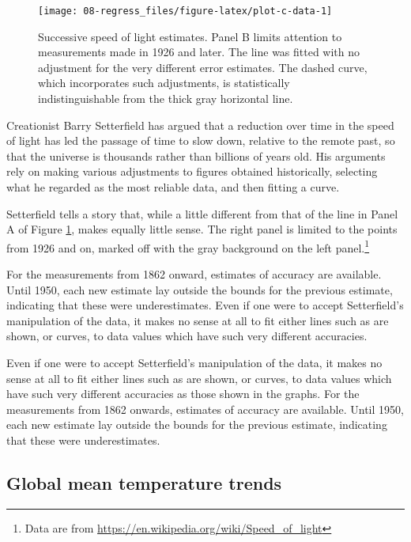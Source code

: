 \documentclass[
  10ptls,
  b5paper]{book}
\begin{document}
\begin{figure}[H]

{\centering \texttt{[image: 08-regress\_files/figure-latex/plot-c-data-1]} 

}

\caption{Successive speed of light estimates.  Panel B 
limits attention to measurements made in 1926 and later. 
The line was fitted with no adjustment for the very
different error estimates.  The dashed curve, which 
incorporates such adjustments, is statistically 
indistinguishable from the thick gray horizontal line.}\label{fig:plot-c-data}
\end{figure}

Creationist Barry Setterfield has argued that a reduction over time in the speed of light has led the passage of time to slow down, relative to the remote past, so that the universe is thousands rather than billions of years old. His arguments rely on making various adjustments to figures obtained historically, selecting what he regarded as the most reliable data, and then fitting a curve.

Setterfield tells a story that, while a little different from that of the line in Panel A of Figure \ref{fig:plot-c-data}, makes equally little sense. The right panel is limited to the points from 1926 and on, marked off with the gray background on the left panel.\footnote{Data are from \url{https://en.wikipedia.org/wiki/Speed_of_light}}

For the measurements from 1862 onward, estimates of accuracy are available. Until 1950, each new estimate lay outside the bounds for the previous estimate, indicating that these were underestimates. Even if one were to accept Setterfield's manipulation of the data, it makes no sense at all to fit either lines such as are shown, or curves, to data values which have such very different accuracies.

Even if one were to accept Setterfield's manipulation of the data, it makes no sense at all to fit either lines such as are shown, or curves, to data values which have such very different accuracies as those shown in the graphs. For the measurements from 1862 onwards, estimates of accuracy are available. Until 1950, each new estimate lay outside the bounds for the previous estimate, indicating that these were underestimates.

\hypertarget{global-mean-temperature-trends}{%
\subsection{Global mean temperature trends}\label{global-mean-temperature-trends}}
\end{document}

